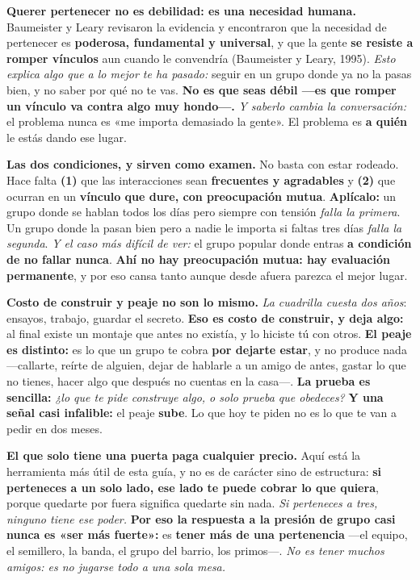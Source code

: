 \documentclass[11pt,letterpaper]{article}
\newcommand{\milcpaso}[3]{%
\Needspace{4\baselineskip}%
\begin{tcolorbox}[enhanced,colback=white,colframe=milcLinea,arc=1.5mm,boxrule=.9pt,
  left=14mm,right=4mm,top=3mm,bottom=3mm,before skip=4pt,after skip=4pt,
  fontupper=\RaggedRight,
  overlay={\node[anchor=north west,circle,fill=#2,text=white,inner sep=0pt,
    minimum size=7.4mm,font=\sffamily\bfseries\small]
    at ([xshift=3.6mm,yshift=-3.2mm]frame.north west) {#1};}]
#3
\end{tcolorbox}}
\begin{document}
\milcpaso{1}{milcTurquesa}{\textbf{Querer pertenecer no es debilidad: es una necesidad humana.} Baumeister y Leary revisaron la evidencia y encontraron que la necesidad de pertenecer es \textbf{poderosa, fundamental y universal}, y que la gente \textbf{se resiste a romper vínculos} aun cuando le convendría (Baumeister y Leary, 1995). \emph{Esto explica algo que a lo mejor te ha pasado:} seguir en un grupo donde ya no la pasas bien, y no saber por qué no te vas. \textbf{No es que seas débil ---es que romper un vínculo va contra algo muy hondo---.} \emph{Y saberlo cambia la conversación:} el problema nunca es «me importa demasiado la gente». El problema es \textbf{a quién} le estás dando ese lugar.}
\milcpaso{2}{milcTurquesa}{\textbf{Las dos condiciones, y sirven como examen.} No basta con estar rodeado. Hace falta \textbf{(1)} que las interacciones sean \textbf{frecuentes y agradables} y \textbf{(2)} que ocurran en un \textbf{vínculo que dure, con preocupación mutua}. \textbf{Aplícalo:} un grupo donde se hablan todos los días pero siempre con tensión \emph{falla la primera}. Un grupo donde la pasan bien pero a nadie le importa si faltas tres días \emph{falla la segunda}. \emph{Y el caso más difícil de ver:} el grupo popular donde entras \textbf{a condición de no fallar nunca}. \textbf{Ahí no hay preocupación mutua: hay evaluación permanente}, y por eso cansa tanto aunque desde afuera parezca el mejor lugar.}
\milcpaso{3}{milcTurquesa}{\textbf{Costo de construir y peaje no son lo mismo.} \emph{La cuadrilla cuesta dos años}: ensayos, trabajo, guardar el secreto. \textbf{Eso es costo de construir, y deja algo:} al final existe un montaje que antes no existía, y lo hiciste tú con otros. \textbf{El peaje es distinto:} es lo que un grupo te cobra \textbf{por dejarte estar}, y no produce nada ---callarte, reírte de alguien, dejar de hablarle a un amigo de antes, gastar lo que no tienes, hacer algo que después no cuentas en la casa---. \textbf{La prueba es sencilla:} \emph{¿lo que te pide construye algo, o solo prueba que obedeces?} \textbf{Y una señal casi infalible:} el peaje \textbf{sube}. Lo que hoy te piden no es lo que te van a pedir en dos meses.}
\milcpaso{4}{milcTurquesa}{\textbf{El que solo tiene una puerta paga cualquier precio.} Aquí está la herramienta más útil de esta guía, y no es de carácter sino de estructura: \textbf{si perteneces a un solo lado, ese lado te puede cobrar lo que quiera}, porque quedarte por fuera significa quedarte sin nada. \emph{Si perteneces a tres, ninguno tiene ese poder.} \textbf{Por eso la respuesta a la presión de grupo casi nunca es «ser más fuerte»:} es \textbf{tener más de una pertenencia} ---el equipo, el semillero, la banda, el grupo del barrio, los primos---. \emph{No es tener muchos amigos: es no jugarse todo a una sola mesa.}}
\end{document}
